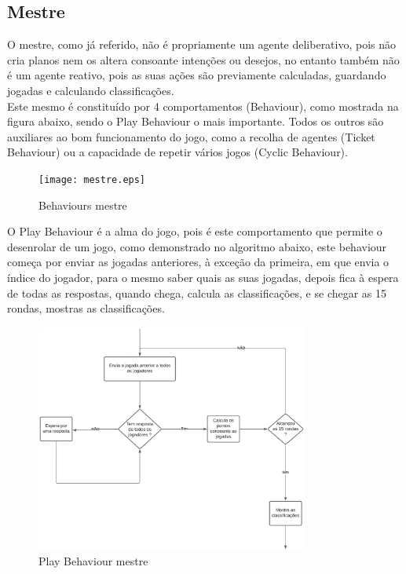 \documentclass[12pt]{article}
\begin{document}
	
	\subsection*{Mestre}
    O mestre, como já referido, não é propriamente um agente deliberativo, pois não cria planos nem os altera consoante intenções ou desejos, no entanto também não é um agente reativo, pois as suas ações são previamente calculadas, guardando jogadas e calculando classificações.\\
    Este mesmo é constituído por 4 comportamentos (Behaviour), como mostrada na figura abaixo, sendo o Play Behaviour o mais importante. Todos os outros são auxiliares ao bom funcionamento do jogo, como a recolha de agentes (Ticket Behaviour) ou a capacidade de repetir vários jogos (Cyclic Behaviour).\\

    
    \begin{figure}[h]
		\centering
        \texttt{[image: mestre.eps]}
		\caption{Behaviours mestre}
		\label{fig:mestre}
	\end{figure}
	
    O Play Behaviour é a alma do jogo, pois é este comportamento que permite o desenrolar de um jogo, como demonstrado no algoritmo abaixo, este behaviour começa por enviar as jogadas anteriores, à exceção da primeira, em que envia o índice do jogador, para o mesmo saber quais as suas jogadas, depois fica à espera de todas as respostas, quando chega, calcula as classificações, e se chegar as 15 rondas, mostras as classificações.\\

	\begin{figure}[h]
		\centering
        \includegraphics[width=0.80\textwidth]{mestrealg.eps}
		\caption{Play Behaviour mestre}
		\label{fig:mestrealg}
	\end{figure}
	
\end{document}
